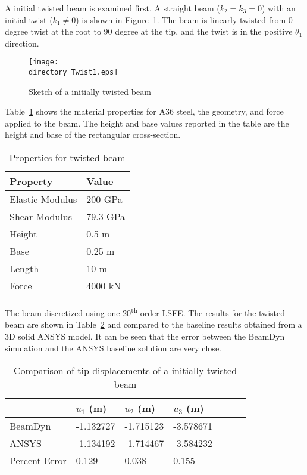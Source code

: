 \documentclass{aiaa-tc}
\def\directory{EPSF/}
\begin{document}
A initial twisted beam is examined first. A straight beam ($k_2=k_3=0$) with an initial twist ($k_1\neq 0$) is shown in Figure~\ref{Twist1}. The beam is linearly twisted from 0 degree twist at the root to 90 degree at the tip, and the twist is in the positive $\theta_1$ direction.
\begin{figure}
\centering
\texttt{[image: \\directory Twist1.eps]}
\caption{Sketch of a initially twisted beam} 
\label{Twist1}
\end{figure}
 Table~\ref{E1Property} shows the material properties for A36 steel, the geometry, and force applied to the beam. The height and base values reported in the table are the height and base of the rectangular cross-section. 
 \begin{table}
\caption{\label{E1Property} Properties for twisted beam}
\begin{center}
    \begin{tabular}{| l | l |}
    	\hline
    	Property               & Value   \\ \hline
    	Elastic Modulus                      & 200 GPa \\ \hline
    	Shear Modulus                      & 79.3 GPa \\ \hline
    	Height                      & 0.5 m   \\ \hline
    	Base                      & 0.25 m  \\ \hline
    	Length                      & 10 m    \\ \hline
    	Force                      & 4000 kN \\ \hline
    \end{tabular}
\end{center}
\end{table}
The beam discretized using one 20\textsuperscript{th}-order LSFE. The results for the twisted beam are shown in Table~\ref{E1u} and compared to the baseline results obtained from a 3D solid ANSYS model. It can be seen that the error between the BeamDyn simulation and the ANSYS baseline solution are very close. 
\begin{table}
\caption{\label{E1u} Comparison of tip displacements of a initially twisted beam} 
\begin{center} 
    \begin{tabular}{| l | l | l | l | l | l | l |}
    	\hline
    	        & $u_1$ (m) & $u_2$ (m) & $u_3$ (m)  \\ \hline
    	BeamDyn  & -1.132727     & -1.715123       & -3.578671      \\  \hline
    	ANSYS   & -1.134192     & -1.714467      & -3.584232     \\ \hline
    	Percent Error   & 0.129     & 0.038      & 0.155     \\ \hline
    \end{tabular}
\end{center}
\end{table} 
\end{document}
